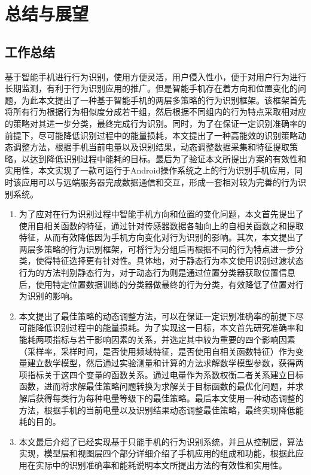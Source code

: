 ﻿\chapter{总结与展望}

\section{工作总结}
\par 基于智能手机进行行为识别，使用方便灵活，用户侵入性小，便于对用户行为进行长期监测，有利于行为识别应用的推广。但是智能手机存在着方向和位置变化的问题，为此本文提出了一种基于智能手机的两层多策略的行为识别框架。该框架首先将所有行为根据行为相似度分成若干组，然后根据不同组内的行为特点采取相对应的策略对其进一步分类，最终完成行为识别。同时，为了在保证一定识别准确率的前提下，尽可能降低识别过程中的能量损耗，本文提出了一种高能效的识别策略动态调整方法，根据手机当前电量以及识别结果，动态调整数据采集和特征提取策略，以达到降低识别过程中能耗的目标。最后为了验证本文所提出方案的有效性和实用性，本文实现了一款可运行于Android操作系统之上的行为识别手机应用，同时该应用可以与远端服务器完成数据通信和交互，形成一套相对较为完善的行为识别系统。
\begin{enumerate}
	\item 为了应对在行为识别过程中智能手机方向和位置的变化问题，本文首先提出了使用自相关函数的特征，通过针对传感器数据各轴向上的自相关函数之和提取特征，从而有效降低因为手机方向变化对行为识别的影响。其次，本文提出了两层多策略的行为识别框架，可将行为分组后再根据不同的行为特点进一步分类，使得特征选择更有针对性。具体地，对于静态行为本文使用识别过渡状态行为的方法判别静态行为，对于动态行为则是通过位置分类器获取位置信息后，使用特定位置数据训练的分类器做最终的行为分类，有效降低了位置对行为识别的影响。
	\item 本文提出了最佳策略的动态调整方法，可以在保证一定识别准确率的前提下尽可能降低识别过程中的能量损耗。为了实现这一目标，本文首先研究准确率和能耗两项指标与若干影响因素的关系，并选定其中较为重要的四个影响因素（采样率，采样时间，是否使用频域特征，是否使用自相关函数特征）作为变量建立数学模型，然后通过实验测量和计算的方法求解数学模型参数，获得两项指标关于这四个变量的函数关系。通过电量作为系数权衡二者关系建立目标函数，进而将求解最佳策略问题转换为求解关于目标函数的最优化问题，并求解后获得每类行为每种电量等级下的最佳策略。最后本文使用一种动态调整的方法，根据手机的当前电量以及识别结果动态调整最佳策略，最终实现降低能耗的目的。
	\item 本文最后介绍了已经实现基于只能手机的行为识别系统，并且从控制层，算法实现，模型层和视图层四个部分详细介绍了手机应用的组成和功能，根据此应用在实际中的识别准确率和能耗说明本文所提出方法的有效性和实用性。
\end{enumerate}	
